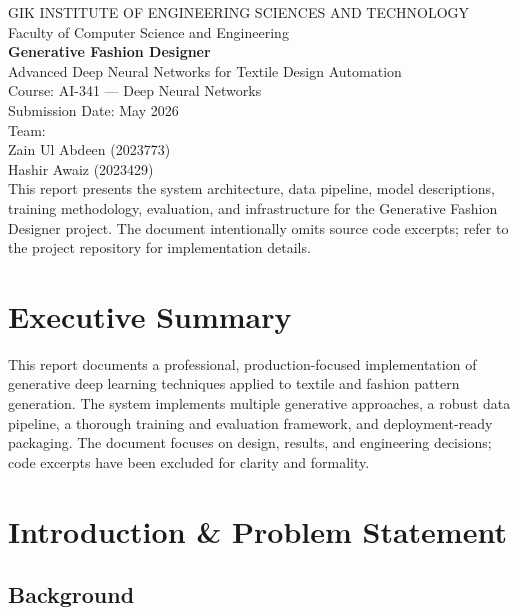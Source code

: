 \documentclass[12pt,a4paper]{report}
\begin{document}
\begin{titlepage}
  \centering
  {\LARGE GIK INSTITUTE OF ENGINEERING SCIENCES AND TECHNOLOGY\\[1ex]}
  {\large Faculty of Computer Science and Engineering}\\[3cm]

  {\Huge\bfseries Generative Fashion Designer}\\[1ex]
  {\Large Advanced Deep Neural Networks for Textile Design Automation}\\[2cm]

  {\large Course: AI-341 — Deep Neural Networks}\\[1ex]
  {\large Submission Date: May 2026}\\[2cm]

  {\large Team:}\\[1ex]
  {Zain Ul Abdeen (2023773)\\Hashir Awaiz (2023429)}\\[3cm]

  \vfill
  {\small This report presents the system architecture, data pipeline, model descriptions, training methodology, evaluation, and infrastructure for the Generative Fashion Designer project. The document intentionally omits source code excerpts; refer to the project repository for implementation details.}
\end{titlepage}

\tableofcontents
\clearpage

\chapter{Executive Summary}

This report documents a professional, production-focused implementation of generative deep learning techniques applied to textile and fashion pattern generation. The system implements multiple generative approaches, a robust data pipeline, a thorough training and evaluation framework, and deployment-ready packaging. The document focuses on design, results, and engineering decisions; code excerpts have been excluded for clarity and formality.

\chapter{Introduction \& Problem Statement}

\section{Background}
\end{document}
